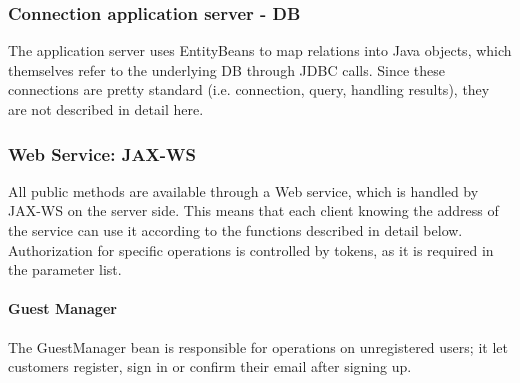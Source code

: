 \subsubsection{Connection application server - DB} %
\label{ssub:connection_application_server_db}
The application server uses EntityBeans to map relations into Java objects, which themselves refer to the underlying DB through JDBC calls. Since these connections are pretty standard (i.e. connection, query, handling results), they are not described in detail here.

\subsubsection{Web Service: JAX-WS} %
\label{ssub:web_service_jax_ws}
All public methods are available through a Web service, which is handled by JAX-WS on the server side. This means that each client knowing the address of the service can use it according to the functions described in detail below. Authorization for specific operations is controlled by tokens, as it is required in the parameter list.

\pagebreak
\paragraph{Guest Manager} %
\label{par:guest_manager}
The GuestManager bean is responsible for operations on unregistered users; it let customers register, sign in or confirm their email after signing up.
\begin{table}[h!]
\centering
{}
\end{table}

